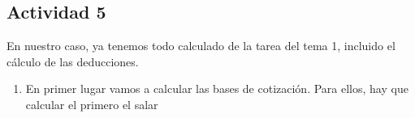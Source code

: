 \subsection{Actividad 5}
En nuestro caso, ya tenemos todo calculado de la tarea del tema 1, incluido el cálculo de las deducciones.
\begin{enumerate}[label=\alph*)]
    \item En primer lugar vamos a calcular las bases de cotización. Para ellos, hay que calcular el primero el salar
\end{enumerate}


\newpage



